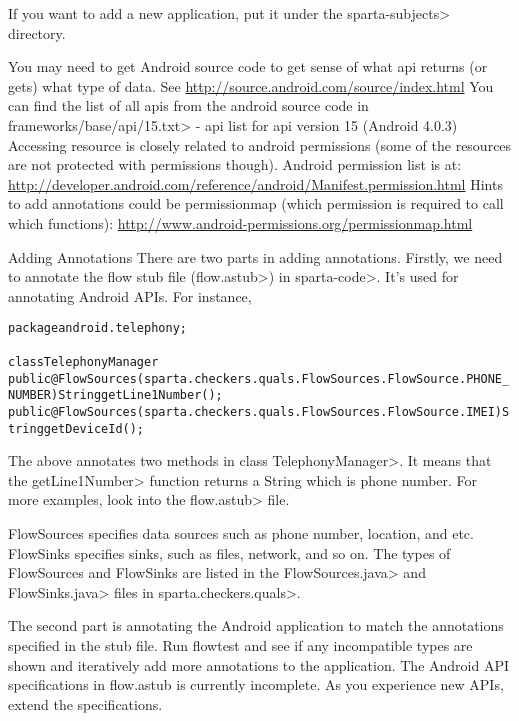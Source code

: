 If you want to add a new application, put it under the
\<sparta-subjects> directory.

You may need to get Android source code to get sense of what api returns (or
gets) what type of data. See \url{http://source.android.com/source/index.html}
You can find the list of all apis from the android source code in 
\<frameworks/base/api/15.txt> - api list for api version 15 (Android 4.0.3)
Accessing resource is closely related to android permissions (some of the
resources are not protected with permissions though). Android permission list
is at:
\url{http://developer.android.com/reference/android/Manifest.permission.html}
Hints to add annotations could be permissionmap (which permission is required
to call which functions):
\url{http://www.android-permissions.org/permissionmap.html}


Adding Annotations
There are two parts in adding annotations. 
Firstly, we need to annotate the flow stub file (\<flow.astub>) in
\<sparta-code>.
It's used for annotating Android APIs. For instance, 

\begin{alltt}
package android.telephony;

class TelephonyManager {
    public @FlowSources(sparta.checkers.quals.FlowSources.FlowSource.PHONE_NUMBER) String getLine1Number();
    public @FlowSources(sparta.checkers.quals.FlowSources.FlowSource.IMEI) String getDeviceId();
}
\end{alltt}

The above annotates two methods in class \<TelephonyManager>.
It means that the \<getLine1Number> function returns a String which is
phone number.  For more examples, look into the \<flow.astub> file.

FlowSources specifies data sources such as phone number, location, and
etc. FlowSinks specifies sinks, such as files, network, and so on.
The types of FlowSources and FlowSinks are listed in the
\<FlowSources.java> and \<FlowSinks.java> files in \<sparta.checkers.quals>.


The second part is annotating the Android application to match
the annotations specified in the stub file. Run flowtest and see if
any incompatible types are shown and iteratively add more annotations
to the application.
The Android API specifications in flow.astub is currently
incomplete. As you experience new APIs, extend the specifications.
